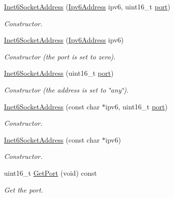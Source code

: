 \begin{DoxyCompactItemize}
\item 
\hyperlink{classns3_1_1Inet6SocketAddress_a33435953a9ae4930e4cb4d8fbe592709}{Inet6\+Socket\+Address} (\hyperlink{classns3_1_1Ipv6Address}{Ipv6\+Address} ipv6, uint16\+\_\+t \hyperlink{visualizer-ideas_8txt_a21ff1c530daf8435e00048b7fc2c58e3}{port})
\begin{DoxyCompactList}\small\item\em Constructor. \end{DoxyCompactList}\item 
\hyperlink{classns3_1_1Inet6SocketAddress_ac13989a71f91101b44addc84952a5ce6}{Inet6\+Socket\+Address} (\hyperlink{classns3_1_1Ipv6Address}{Ipv6\+Address} ipv6)
\begin{DoxyCompactList}\small\item\em Constructor (the port is set to zero). \end{DoxyCompactList}\item 
\hyperlink{classns3_1_1Inet6SocketAddress_a94edb9771f63afa60a6c751ef41cdb87}{Inet6\+Socket\+Address} (uint16\+\_\+t \hyperlink{visualizer-ideas_8txt_a21ff1c530daf8435e00048b7fc2c58e3}{port})
\begin{DoxyCompactList}\small\item\em Constructor (the address is set to \char`\"{}any\char`\"{}). \end{DoxyCompactList}\item 
\hyperlink{classns3_1_1Inet6SocketAddress_abf6b2252e8b7c620814dfb6fad386c98}{Inet6\+Socket\+Address} (const char $\ast$ipv6, uint16\+\_\+t \hyperlink{visualizer-ideas_8txt_a21ff1c530daf8435e00048b7fc2c58e3}{port})
\begin{DoxyCompactList}\small\item\em Constructor. \end{DoxyCompactList}\item 
\hyperlink{classns3_1_1Inet6SocketAddress_a3a4e43f4973f02476afea93e79775638}{Inet6\+Socket\+Address} (const char $\ast$ipv6)
\begin{DoxyCompactList}\small\item\em Constructor. \end{DoxyCompactList}\item 
uint16\+\_\+t \hyperlink{classns3_1_1Inet6SocketAddress_a62a2ada36d9dfac670979a03c01a698c}{Get\+Port} (void) const 
\begin{DoxyCompactList}\small\item\em Get the port. \end{DoxyCompactList}\item 

\end{DoxyCompactItemize}
